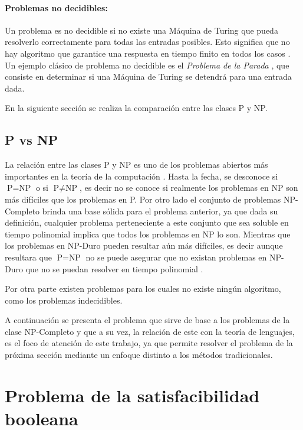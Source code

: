 \paragraph{Problemas no decidibles:}
Un problema es no decidible si no existe una Máquina de Turing que pueda resolverlo correctamente para todas las entradas posibles. Esto significa que no hay algoritmo que garantice una respuesta en tiempo finito en todos los casos \cite{authomataTheory}. Un ejemplo clásico de problema no decidible es el \textit{Problema de la Parada} \cite{authomataTheory}, que consiste en determinar si una Máquina de Turing se detendrá para una entrada dada.

En la siguiente sección se realiza la comparación entre las clases P y NP.

\subsection{P vs NP}

La relación entre las clases P y NP es uno de los problemas abiertos más importantes en la teoría de la
computación \cite{authomataTheory}. Hasta la fecha, se desconoce si $\text{P} = \text{NP}$ o si $\text{P} \neq \text{NP}$,
es decir no se conoce si realmente los problemas en NP son más difíciles que los problemas en P. Por otro
lado el conjunto de problemas NP-Completo brinda una base sólida para el problema anterior, ya que dada su
definición, cualquier problema perteneciente a este conjunto que sea soluble en tiempo polinomial
implica que todos los problemas en NP lo son. Mientras que los problemas en NP-Duro pueden resultar aún más
difíciles, es decir aunque resultara que $\text{P} = \text{NP}$ no se puede asegurar que no existan problemas
en NP-Duro que no se puedan resolver en tiempo polinomial \cite{authomataTheory}.

Por otra parte existen problemas para los cuales no existe ningún algoritmo, como los problemas indecidibles.

A continuación se presenta el problema que sirve de base a los problemas de la clase NP-Completo y que a su
vez, la relación de este con la teoría de lenguajes, es el foco de atención de este trabajo, ya que permite 
resolver el problema de la próxima sección mediante un enfoque distinto a los métodos tradicionales.

\section{Problema de la satisfacibilidad booleana}


